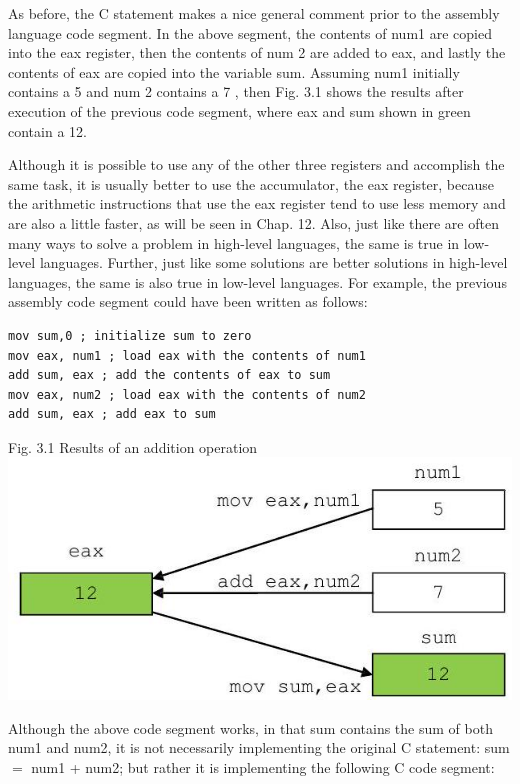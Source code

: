 \documentclass[10pt]{article}
\begin{document}
As before, the C statement makes a nice general comment prior to the assembly language code segment. In the above segment, the contents of num1 are copied into the eax register, then the contents of num 2 are added to eax, and lastly the contents of eax are copied into the variable sum. Assuming num1 initially contains a 5 and num 2 contains a 7 , then Fig. 3.1 shows the results after execution of the previous code segment, where eax and sum shown in green contain a 12.

Although it is possible to use any of the other three registers and accomplish the same task, it is usually better to use the accumulator, the eax register, because the arithmetic instructions that use the eax register tend to use less memory and are also a little faster, as will be seen in Chap. 12. Also, just like there are often many ways to solve a problem in high-level languages, the same is true in low-level languages. Further, just like some solutions are better solutions in high-level languages, the same is also true in low-level languages. For example, the previous assembly code segment could have been written as follows:

\begin{verbatim}
mov sum,0 ; initialize sum to zero
mov eax, num1 ; load eax with the contents of num1
add sum, eax ; add the contents of eax to sum
mov eax, num2 ; load eax with the contents of num2
add sum, eax ; add eax to sum
\end{verbatim}

Fig. 3.1 Results of an addition operation\\
\includegraphics[max width=\textwidth, center]{2025_03_24_ebe50cc223a6fbc49eecg-046}

Although the above code segment works, in that sum contains the sum of both num1 and num2, it is not necessarily implementing the original C statement: sum $=$ num1 + num2; but rather it is implementing the following C code segment:
\end{document}

